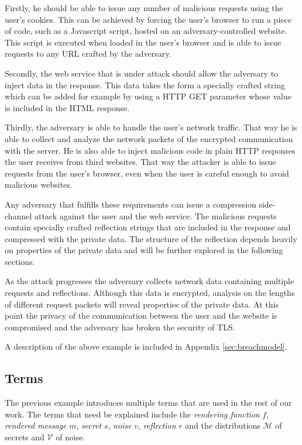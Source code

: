 \documentclass[conference, letterpaper, 10pt]{IEEEtran}
\begin{document}
Firstly, he should be able to issue any number of malicious requests using the
user's cookies. This can be achieved by forcing the user's browser to run a
piece of code, such as a Javascript script, hosted on an adversary-controlled
website. This script is executed when loaded in the user's browser and is able
to issue requests to any URL crafted by the adversary.

Secondly, the web service that is under attack should allow the adversary to
inject data in the response. This data takes the form a specially crafted string
which can be added for example by using a HTTP GET parameter whose value is included in the
HTML response.

Thirdly, the adversary is able to handle the user's network traffic. That way he
is able to collect and analyze the network packets of the encrypted
communication with the server. He is also able to inject malicious code in
plain HTTP responses the user receives from third websites. That way the
attacker is able to issue requests from the user's browser, even when the user is
careful enough to avoid malicious websites.

Any adversary that fulfills these requirements can issue a compression side-channel attack against the
user and the web service. The malicious requests contain specially crafted
reflection strings that are included in the response and compressed with the
private data. The structure of the reflection depends heavily on properties of
the private data and will be further explored in the following sections.

As the attack progresses the adversary collects network data containing multiple
requests and reflections. Although this data is encrypted, analysis on the
lengths of different request packets will reveal properties of the private data.
At this point the privacy of the communication between the user and the website is
compromised and the adversary has broken the security of TLS.

A description of the above example is included in Appendix \ref{sec:breachmodel}.

\subsection{Terms}\label{subsec:terms}
The previous example introduces multiple terms that are used in the rest of our
work. The terms that need be explained include the \textit{rendering function}
$f$, \textit{rendered message} $m$, \textit{secret} $s$, \textit{noise} $v$,
\textit{reflection} $r$ and the distributions $\mathcal{M}$ of secrets and
$\mathcal{V}$ of noise.
\end{document}
